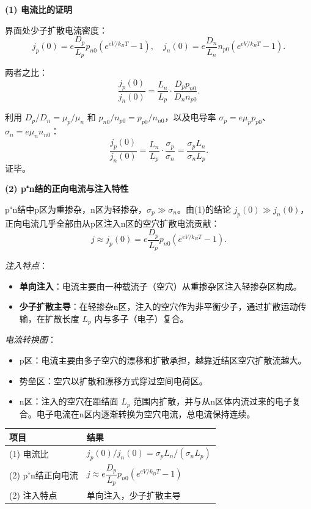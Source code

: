 \begin{derivationbox}[标准解题过程]
\textbf{(1) 电流比的证明}

界面处少子扩散电流密度：
\[
j_p(0)=e\frac{D_p}{L_p}p_{n0}(e^{eV/k_BT}-1),\quad j_n(0)=e\frac{D_n}{L_n}n_{p0}(e^{eV/k_BT}-1).
\]

两者之比：
\[
\frac{j_p(0)}{j_n(0)}=\frac{L_n}{L_p}\cdot\frac{D_pp_{n0}}{D_nn_{p0}}.
\]

利用 $D_p/D_n=\mu_p/\mu_n$ 和 $p_{n0}/n_{p0}=p_{p0}/n_{n0}$，以及电导率 $\sigma_p=e\mu_pp_{p0}$、$\sigma_n=e\mu_nn_{n0}$：
\[
\frac{j_p(0)}{j_n(0)}=\frac{L_n}{L_p}\cdot\frac{\sigma_p}{\sigma_n}=\frac{\sigma_pL_n}{\sigma_nL_p}.
\]
证毕。

\textbf{(2) p⁺n结的正向电流与注入特性}

p⁺n结中p区为重掺杂，n区为轻掺杂，$\sigma_p\gg\sigma_n$。由(1)的结论 $j_p(0)\gg j_n(0)$，正向电流几乎全部由从p区注入n区的空穴扩散电流贡献：
\begin{equation}
\boxed{j\approx j_p(0)=e\frac{D_p}{L_p}p_{n0}(e^{eV/k_BT}-1).}
\end{equation}

\textit{注入特点}：
\begin{itemize}
    \item \textbf{单向注入}：电流主要由一种载流子（空穴）从重掺杂区注入轻掺杂区构成。
    \item \textbf{少子扩散主导}：在轻掺杂n区，注入的空穴作为非平衡少子，通过扩散运动传输，在扩散长度 $L_p$ 内与多子（电子）复合。
\end{itemize}

\textit{电流转换图}：
\begin{itemize}
    \item p区：电流主要由多子空穴的漂移和扩散承担，越靠近结区空穴扩散流越大。
    \item 势垒区：空穴以扩散和漂移方式穿过空间电荷区。
    \item n区：注入的空穴在距结面 $L_p$ 范围内扩散，并与从n区体内流过来的电子复合。电子电流在n区内逐渐转换为空穴电流，总电流保持连续。
\end{itemize}
\end{derivationbox}

\begin{formulabox}[答案汇总]
\begin{center}
\begin{tabular}{ll}
\toprule
\textbf{项目} & \textbf{结果} \\
\midrule
(1) 电流比 & $j_p(0)/j_n(0)=\sigma_pL_n/(\sigma_nL_p)$ \\
(2) p⁺n结正向电流 & $j\approx e\dfrac{D_p}{L_p}p_{n0}(e^{eV/k_BT}-1)$ \\
(2) 注入特点 & 单向注入，少子扩散主导 \\
\bottomrule
\end{tabular}
\end{center}
\end{formulabox}

